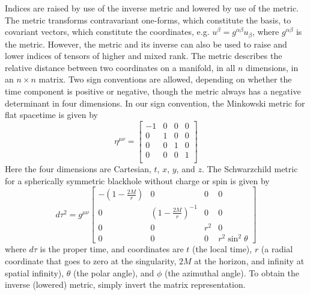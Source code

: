 Indices are raised by use of the inverse metric and lowered by use of the metric. The metric transforms contravariant one-forms, which constitute the basis, to covariant vectors, which constitute the coordinates, e.g. $u^\beta=g^{\alpha\beta}u_\beta$, where $g^{\alpha\beta}$ is the metric. However, the metric and its inverse can also be used to raise and lower indices of tensors of higher and mixed rank. The metric describes the relative distance between two coordinates on a manifold, in all $n$ dimensions, in an $n\times n$ matrix. Two sign conventions are allowed, depending on whether the time component is positive or negative, though the metric always has a negative determinant in four dimensions. In our sign convention, the Minkowski metric for flat spacetime is given by
\[
\eta^{\mu\nu}=
\begin{bmatrix}
  -1 & 0 & 0 & 0\\
  0 & 1 & 0 & 0\\
  0 & 0 & 1 & 0\\
  0 & 0 & 0 & 1\\
\end{bmatrix}
\]
Here the four dimensions are Cartesian, $t$, $x$, $y$, and $z$. The Schwarzchild metric for a spherically symmetric blackhole without charge or spin is given by
\[
d\tau^2=g^{\mu\nu}
\begin{bmatrix}
  -(1-\frac{2M}{r}) & 0 & 0 & 0\\
  0 & (1-\frac{2M}{r})^{-1} & 0 &0\\
  0 & 0 & r^2 & 0\\
  0 & 0 & 0 & r^2\sin^2\theta
\end{bmatrix}
\]
where $d\tau$ is the proper time, and coordinates are $t$ (the local time), $r$ (a radial coordinate that goes to zero at the singularity, $2M$ at the horizon, and infinity at spatial infinity), $\theta$ (the polar angle), and $\phi$ (the azimuthal angle). To obtain the inverse (lowered) metric, simply invert the matrix representation.


